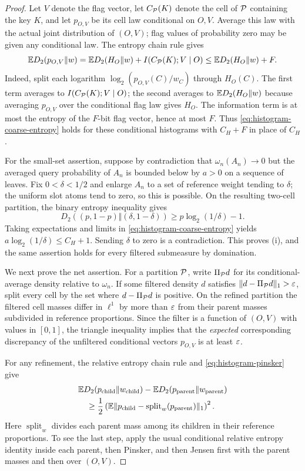 \begin{proof}
Let $V$ denote the flag vector, let $C_{\mathcal P}(K)$ denote the cell of
$\mathcal P$ containing the key $K$, and let $p_{O,V}$ be its cell law
conditional on $O,V$. Average this law with the actual joint
distribution of $(O,V)$; flag values of probability zero may be given
any conditional law. The entropy chain rule gives
\[
 \mathbb E D_2(p_{O,V}\Vert w)
 =\mathbb E D_2(H_O\Vert w)+I(C_{\mathcal P}(K);V\mid O)
 \le\mathbb E D_2(H_O\Vert w)+F.
\]
Indeed, split each logarithm $\log_2(p_{O,V}(C)/w_C)$ through
$H_O(C)$. The first term averages to $I(C_{\mathcal P}(K);V\mid O)$; the second
averages to $\mathbb E D_2(H_O\Vert w)$ because averaging $p_{O,V}$ over
the conditional flag law gives $H_O$. The information term is at
most the entropy of the $F$-bit flag vector, hence at most $F$.
Thus \eqref{eq:histogram-coarse-entropy} holds for these conditional
histograms with $C_H+F$ in place of $C_H$.

For the small-set assertion, suppose by contradiction that
$\omega_n(A_n)\to0$ but the averaged query probability of $A_n$ is
bounded below by $a>0$ on a sequence of leaves. Fix $0<\delta<1/2$ and
enlarge $A_n$ to a set of reference weight tending to $\delta$; the
uniform slot atoms tend to zero, so this is possible. On the resulting
two-cell partition, the binary entropy inequality gives
\[
 D_2((p,1-p)\Vert(\delta,1-\delta))
 \ge p\log_2(1/\delta)-1.
\]
Taking expectations and limits in
\eqref{eq:histogram-coarse-entropy} yields
$a\log_2(1/\delta)\le C_H+1$. Sending $\delta$ to zero is a
contradiction. This proves (i), and the same assertion holds for every
filtered submeasure by domination.

We next prove the net assertion. For a partition $\mathcal P$, write
$\Pi_{\mathcal P}d$ for its conditional-average density relative to
$\omega_n$. If some filtered density $d$ satisfies
$\lVert d-\Pi_{\mathcal P}d\rVert_1>\varepsilon$, split every cell by the set where
$d-\Pi_{\mathcal P}d$ is positive. On the refined partition the filtered cell
masses differ in $\ell^1$ by more than $\varepsilon$ from their parent masses
subdivided in reference proportions. Since the filter is a function
of $(O,V)$ with values in $[0,1]$, the triangle inequality implies that
the \emph{expected} corresponding discrepancy of the unfiltered
conditional vectors $p_{O,V}$ is at least $\varepsilon$.

For any refinement, the relative entropy chain rule and
\eqref{eq:histogram-pinsker} give
\begin{align}\label{eq:histogram-refinement-gain}
 &\mathbb E D_2(p_{\mathrm{child}}\Vert w_{\mathrm{child}})
 -\mathbb E D_2(p_{\mathrm{parent}}\Vert w_{\mathrm{parent}})\notag\\
 &\quad\ge \frac12
 \left(\mathbb E\lVert p_{\mathrm{child}}-
    \operatorname{split}_{w}(p_{\mathrm{parent}})\rVert_1\right)^2.
\end{align}
Here $\operatorname{split}_{w}$ divides each parent mass among its
children in their reference proportions. To see the last step, apply
the usual conditional relative entropy identity inside each parent,
then Pinsker, and then Jensen first with the parent masses and then
over $(O,V)$.


\end{proof}

